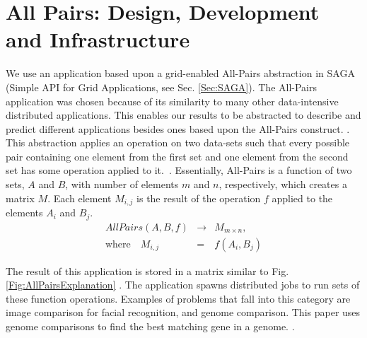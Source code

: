 \documentclass{rspublic}
\newcommand{\micnote}[1]{ {\textcolor{blue} { ***Michael: #1 }}}
\newcommand{\betynote}[1]{ {\textcolor{orange} { ***Bety: #1 }}}
\newcommand{\jhanote}[1]{} \newcommand{\micnote}[1]{}\newcommand{\betynote}[1]{} \newcommand{\fixme}[1]{}
\begin{document}




\section{All Pairs: Design, Development and Infrastructure} We use an
application based upon a grid-enabled All-Pairs abstraction in SAGA
(Simple API for Grid Applications, see Sec. \ref{Sec:SAGA}).  The
All-Pairs application was chosen because of its similarity to many
other data-intensive distributed applications.  This enables our
results to be abstracted to describe and predict different
applications besides ones based upon the All-Pairs
construct. \jhanote{a bit more describing the fact that this is a
  pattern and how benefits will be general}. This abstraction applies
an operation on two data-sets such that every possible pair containing
one element from the first set and one element from the second set has
some operation applied to it.~\citep{Interop, AllPairs}. Essentially,
All-Pairs is a function of two sets, $A$ and $B$, with number of
elements $m$ and $n$, respectively, which creates a matrix $M$. Each
element $M_{i,j}$ is the result of the operation $f$ applied to the
elements $A_i$ and $B_j$.
\begin{eqnarray}
 AllPairs(A, B, f) & \rightarrow & M_{m \times n}, \\
\mbox{where} \quad M_{i,j} & = & f(A_{i},B_{j})
 \end{eqnarray}

The result of this application is stored in a matrix similar to Fig.
\ref{Fig:AllPairsExplanation} . The application spawns distributed jobs
to run sets of these function operations.  Examples of problems that
fall into this category are image comparison for facial recognition, and
genome comparison. This paper uses genome comparisons to find the best
matching gene in a genome. \jhanote{a bit more describing the application}.
\end{document}
